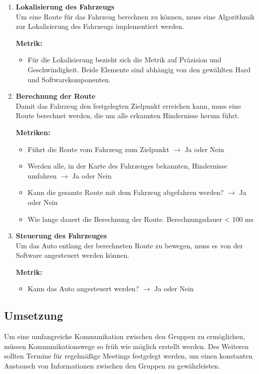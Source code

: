 \begin{enumerate}[leftmargin=*]
    \item \textbf{Lokalisierung des Fahrzeugs}\\
    Um eine Route für das Fahrzeug berechnen zu können, muss eine Algorithmik zur Lokalisierung des Fahrzeugs implementiert werden.

    \textbf{Metrik:} 
    \begin{itemize}
        \item Für die Lokalisierung bezieht sich die Metrik auf Präzision und Ge\-schwindigkeit. 
        Beide Elemente sind abhängig von den gewählten Hard und Softwarekomponenten. 
    \end{itemize}

    \item \textbf{Berechnung der Route}\\
    Damit das Fahrzeug den festgelegten Zielpunkt erreichen kann, muss eine Route berechnet werden, die um alle erkannten Hindernisse herum führt.
    
    \textbf{Metriken:}
    \begin{itemize}
        \item Führt die Route vom Fahrzeug zum Zielpunkt $\to$ Ja oder Nein
        \item Werden alle, in der Karte des Fahrzeuges bekannten, Hindernisse umfahren $\to$ Ja oder Nein
        \item Kann die gesamte Route mit dem Fahrzeug abgefahren werden? $\to$ Ja oder Nein
        \item Wie lange dauert die Berechnung der Route. Berechnungsdauer < 100 ms
    \end{itemize}

    \item \textbf{Steuerung des Fahrzeuges}\\
    Um das Auto entlang der berechneten Route zu bewegen, muss es von der Software angesteuert werden können.

    \textbf{Metrik:}
    \begin{itemize}
        \item Kann das Auto angesteuert werden? $\to$ Ja oder Nein
    \end{itemize}
\end{enumerate}

\subsection{Umsetzung}
Um eine umfangreiche Kommunikation zwischen den Gruppen zu ermögli\-chen, müssen Kommunikationswege so früh wie möglich erstellt werden.
Des Weiteren sollten Termine für regelmäßige Meetings festgelegt werden, um einen konstanten Austausch von Informationen zwischen den Gruppen zu gewähr\-leisten.


